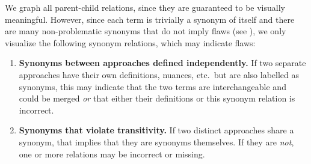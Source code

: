     

    \ExampleGraph{}

    \newpage\fi
We graph all parent-child relations, since they are guaranteed to be visually
meaningful.
However, since each term is trivially a synonym of itself and there are many
non-problematic synonyms that do not imply flaws (see ),
we only visualize the following synonym relations, which may indicate flaws:

\begin{enumerate}

    \item%
          \textbf{Synonyms between approaches defined independently.}\hfill\break
          If two separate approaches have their own definitions, nuances,
          etc.~but are also labelled as synonyms, this may indicate that the
          two terms are interchangeable and could be merged \emph{or} that
          either their definitions or this synonym relation is incorrect.

    \item%
          \textbf{Synonyms that violate transitivity.}\hfill\break
          If two distinct approaches share a synonym, that implies that they
          are synonyms themselves. If they are \emph{not}, one or more
          relations may be incorrect or missing.
\end{enumerate}
